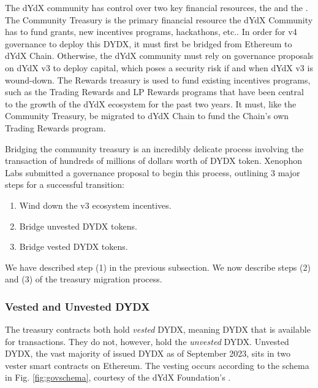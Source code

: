         The dYdX community has control over two key financial resources, the  and the . The Community Treasury is the primary financial resource the dYdX Community has to fund grants, new incentives programs, hackathons, etc.. In order for v4 governance to deploy this DYDX, it must first be bridged from Ethereum to dYdX Chain.  Otherwise, the dYdX community must rely on governance proposals on dYdX v3 to deploy capital, which poses a security risk if and when dYdX v3 is wound-down. The Rewards treasury is used to fund existing incentives programs, such as the Trading Rewards and LP Rewards programs that have been central to the growth of the dYdX ecosystem for the past two years. It must, like the Community Treasury, be migrated to dYdX Chain to fund the Chain's own Trading Rewards program.

        Bridging the community treasury is an incredibly delicate process involving the transaction of hundreds of millions of dollars worth of DYDX token. Xenophon Labs submitted a governance proposal to begin this process, outlining 3 major steps for a successful transition:

        \begin{enumerate}
            \item Wind down the v3 ecosystem incentives.
            \item Bridge unvested DYDX tokens.
            \item Bridge vested DYDX tokens.
        \end{enumerate}

        We have described step (1) in the previous subsection. We now describe steps (2) and (3) of the treasury migration process.

        \subsubsection{Vested and Unvested DYDX}

            The treasury contracts both hold \textit{vested} DYDX, meaning DYDX that is available for transactions. They do not, however, hold the \textit{unvested} DYDX. Unvested DYDX, the vast majority of issued DYDX as of September 2023, sits in two vester smart contracts on Ethereum. The vesting occurs according to the schema in Fig. \ref{fig:govschema}, courtesy of the dYdX Foundation's . 

